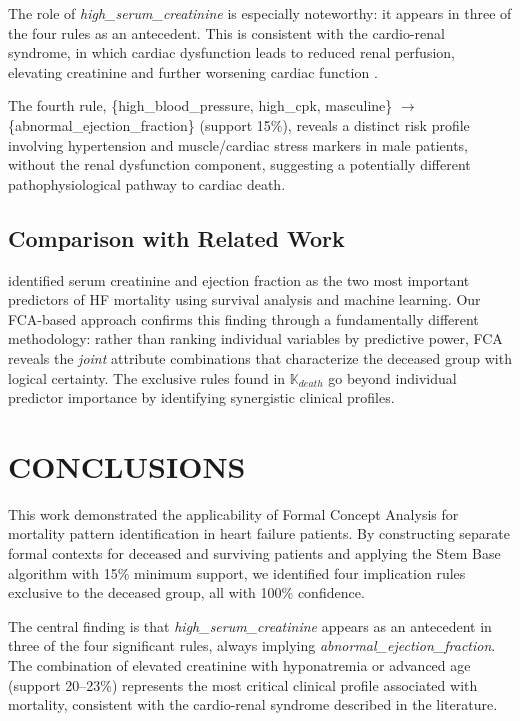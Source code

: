 \documentclass[a4paper,twoside]{article}
\begin{document}
The role of \textit{high\_serum\_creatinine} is especially noteworthy: it appears in three of the four rules as an antecedent. This is consistent with the cardio-renal syndrome, in which cardiac dysfunction leads to reduced renal perfusion, elevating creatinine and further worsening cardiac function \cite{Chicco2020}.

The fourth rule, \{high\_blood\_pressure, high\_cpk, masculine\} $\rightarrow$ \{abnormal\_ejection\_fraction\} (support 15\%), reveals a distinct risk profile involving hypertension and muscle/cardiac stress markers in male patients, without the renal dysfunction component, suggesting a potentially different pathophysiological pathway to cardiac death.

\subsection{Comparison with Related Work}

\cite{Chicco2020} identified serum creatinine and ejection fraction as the two most important predictors of HF mortality using survival analysis and machine learning. Our FCA-based approach confirms this finding through a fundamentally different methodology: rather than ranking individual variables by predictive power, FCA reveals the \textit{joint} attribute combinations that characterize the deceased group with logical certainty. The exclusive rules found in $\mathbb{K}_{death}$ go beyond individual predictor importance by identifying synergistic clinical profiles.

\section{\uppercase{Conclusions}}
\label{sec:conclusion}

\noindent This work demonstrated the applicability of Formal Concept Analysis for mortality pattern identification in heart failure patients. By constructing separate formal contexts for deceased and surviving patients and applying the Stem Base algorithm with 15\% minimum support, we identified four implication rules exclusive to the deceased group, all with 100\% confidence.

The central finding is that \textit{high\_serum\_creatinine} appears as an antecedent in three of the four significant rules, always implying \textit{abnormal\_ejection\_fraction}. The combination of elevated creatinine with hyponatremia or advanced age (support 20--23\%) represents the most critical clinical profile associated with mortality, consistent with the cardio-renal syndrome described in the literature.
\end{document}
